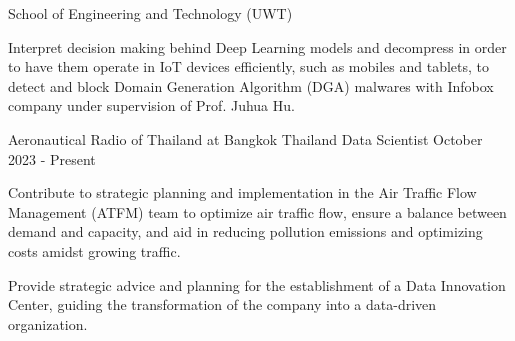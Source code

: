 \begin{cventries}
  \cventry
    {School of Engineering and Technology (UWT) } %
    {} %
    {} %
    {} 
    {
      \begin{cvitems} %
        \item {
          Interpret decision making behind Deep Learning models and decompress in order to have them operate in IoT devices efficiently, such as mobiles and tablets, to detect and block Domain Generation Algorithm (DGA) malwares with Infobox company under supervision of Prof. Juhua Hu.
        }
      \end{cvitems}
    }

  \cventry
    {Aeronautical Radio of Thailand at Bangkok Thailand} %
    {Data Scientist} %
    {October 2023 - Present} %
    {} 
    {
      \begin{cvitems} %
        \item {
          Contribute to strategic planning and implementation in the Air Traffic Flow Management (ATFM) team to optimize air traffic flow, ensure a balance between demand and capacity, and aid in reducing pollution emissions and optimizing costs amidst growing traffic.
        } 
        \item {Provide strategic advice and planning for the establishment of a Data Innovation Center, guiding the transformation of the company into a data-driven organization.}
      \end{cvitems}
    }


\end{cventries}
